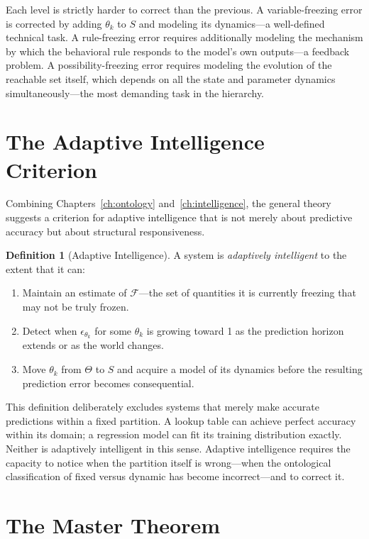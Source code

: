 \documentclass[11pt]{book}
\theoremstyle{plain}
\theoremstyle{definition}
\newtheorem{definition}[theorem]{Definition}
\theoremstyle{remark}
\begin{document}
Each level is strictly harder to correct than the previous. A variable-freezing error is corrected by adding $\theta_k$ to $S$ and modeling its dynamics---a well-defined technical task. A rule-freezing error requires additionally modeling the mechanism by which the behavioral rule responds to the model's own outputs---a feedback problem. A possibility-freezing error requires modeling the evolution of the reachable set itself, which depends on all the state and parameter dynamics simultaneously---the most demanding task in the hierarchy.

\section{The Adaptive Intelligence Criterion}

Combining Chapters~\ref{ch:ontology} and~\ref{ch:intelligence}, the general theory suggests a criterion for adaptive intelligence that is not merely about predictive accuracy but about structural responsiveness.

\begin{definition}[Adaptive Intelligence]
A system is \emph{adaptively intelligent} to the extent that it can:
\begin{enumerate}[label=(\roman*),itemsep=2pt]
\item Maintain an estimate of $\mathcal{F}$---the set of quantities it is currently freezing that may not be truly frozen.
\item Detect when $\epsilon_{\theta_k}$ for some $\theta_k$ is growing toward 1 as the prediction horizon extends or as the world changes.
\item Move $\theta_k$ from $\Theta$ to $S$ and acquire a model of its dynamics before the resulting prediction error becomes consequential.
\end{enumerate}
\end{definition}

This definition deliberately excludes systems that merely make accurate predictions within a fixed partition. A lookup table can achieve perfect accuracy within its domain; a regression model can fit its training distribution exactly. Neither is adaptively intelligent in this sense. Adaptive intelligence requires the capacity to notice when the partition itself is wrong---when the ontological classification of fixed versus dynamic has become incorrect---and to correct it.

\section{The Master Theorem}
\end{document}
